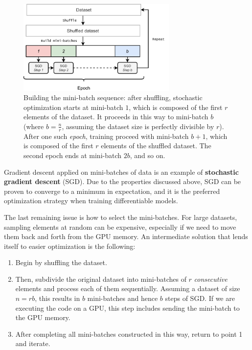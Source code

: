 \begin{figure}
    \centering
    \includegraphics[width=0.7\textwidth]{images/stochastic_optimization.pdf}
    \caption{Building the mini-batch sequence: after shuffling, stochastic optimization starts at mini-batch $1$, which is composed of the first $r$ elements of the dataset. It proceeds in this way to mini-batch $b$ (where $b = \frac{n}{r}$, assuming the dataset size is perfectly divisible by $r$). After one such \textit{epoch}, training proceed with mini-batch $b+1$, which is composed of the first $r$ elements of the shuffled dataset. The second epoch ends at mini-batch $2b$, and so on.}
    \label{fig:building_mini_batches}
\end{figure}

Gradient descent applied on mini-batches of data is an example of \textbf{stochastic gradient descent} (SGD). Due to the properties discussed above, SGD can be proven to converge to a minimum in expectation, and it is the preferred optimization strategy when training differentiable models.

The last remaining issue is how to select the mini-batches. For large datasets, sampling elements at random can be expensive, especially if we need to move them back and forth from the GPU memory. An intermediate solution that lends itself to easier optimization is the following:

\begin{enumerate}
    \item Begin by shuffling the dataset.
    \item Then, subdivide the original dataset into mini-batches of $r$ \textit{consecutive} elements and process each of them sequentially. Assuming a dataset of size $n=rb$, this results in $b$ mini-batches and hence $b$ steps of SGD. If we are executing the code on a GPU, this step includes sending the mini-batch to the GPU memory.
    \item After completing all mini-batches constructed in this way, return to point 1 and iterate.
\end{enumerate}

